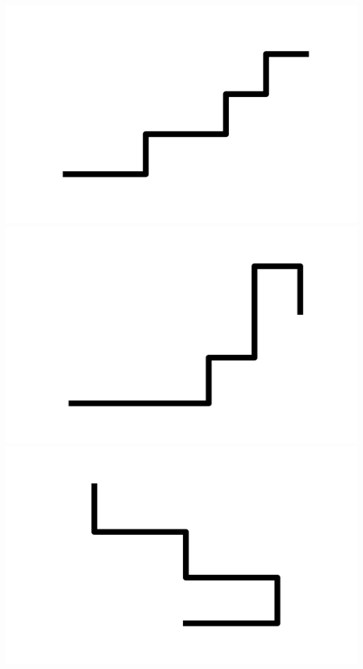 \documentclass[]{report}
\begin{document}
\includegraphics[scale=.1]{pictures/21/state_cluster_shapes_328.pdf} 
\includegraphics[scale=.1]{pictures/21/state_cluster_shapes_329.pdf} 
\includegraphics[scale=.1]{pictures/21/state_cluster_shapes_330.pdf} 
\end{document}
